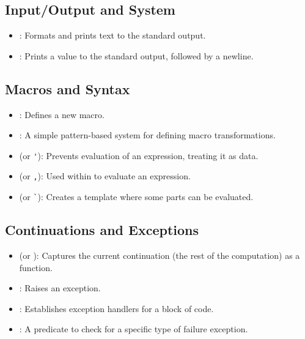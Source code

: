 \subsection{Input/Output and System}
\begin{itemize}
    \item {}: Formats and prints text to the standard output.
    \item {}: Prints a value to the standard output, followed by a newline.
\end{itemize}

\subsection{Macros and Syntax}
\begin{itemize}
    \item {}: Defines a new macro.
    \item {}: A simple pattern-based system for defining macro transformations.
    \item {} (or \verb|'|): Prevents evaluation of an expression, treating it as data.
    \item {} (or \verb|,|): Used within  to evaluate an expression.
    \item {} (or \verb|`|): Creates a template where some parts can be evaluated.
\end{itemize}

\subsection{Continuations and Exceptions}
\begin{itemize}
    \item {} (or ): Captures the current continuation (the rest of the computation) as a function.
    \item {}: Raises an exception.
    \item {}: Establishes exception handlers for a block of code.
    \item {}: A predicate to check for a specific type of failure exception.
\end{itemize}

